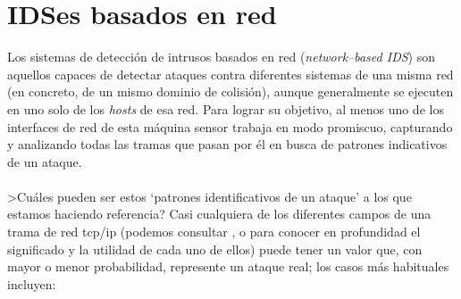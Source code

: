 \section{IDSes basados en red}
Los sistemas de detecci\'on de intrusos basados en red ({\it network--based
IDS}) son aquellos capaces de detectar ataques contra diferentes sistemas de 
una misma red (en concreto, de un mismo dominio de colisi\'on), aunque 
generalmente se ejecuten en uno solo de los {\it hosts} de esa red. Para lograr
su objetivo, al menos uno de los interfaces de red de esta m\'aquina sensor 
trabaja en modo promiscuo, capturando y analizando todas las tramas que pasan 
por \'el en busca de patrones indicativos de un ataque.\\
\\>Cu\'ales pueden ser estos `patrones identificativos de un ataque' a los que
estamos haciendo re\-fe\-ren\-cia? Casi cualquiera de los diferentes campos de 
una trama de red {\sc tcp/ip} (podemos consultar \cite{kn:ste94}, 
\cite{kn:com95} o \cite{kn:tan96} para conocer en profundidad el significado y 
la utilidad de cada uno de ellos) puede tener un valor que, con mayor o menor 
probabilidad, represente un ataque real; los casos m\'as habituales incluyen:
